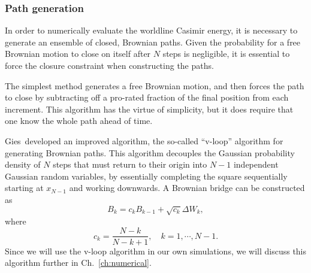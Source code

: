 \subsubsection{Path generation}

In order to numerically evaluate the worldline Casimir energy, it is necessary to generate 
an ensemble of closed, Brownian paths.  Given the probability for a free Brownian motion to close 
on itself after $N$ steps is negligible, it is essential to force the closure constraint when
constructing the paths.  

The simplest method generates a free Brownian motion, and then forces the path to close by subtracting
off a pro-rated fraction of the final position from each increment.  %
This algorithm has the virtue of simplicity, but it does require that one know the whole path ahead of 
time.  

Gies~\etal developed an improved algorithm, the so-called ``v-loop'' algorithm for generating
Brownian paths\cite{Gies2003}. 
This algorithm decouples the Gaussian probability density of $N$ steps that must return
to their origin into $N-1$ independent Gaussian random variables, 
by essentially completing the square sequentially starting at $x_{N-1}$ and working downwards. 
A Brownian bridge can be constructed as 
\begin{equation}
  B_k = c_k B_{k-1} + \sqrt{c_k} \Delta W_k,
\end{equation}
where 
\begin{equation}
  c_k = \frac{N-k}{N-k+1}, \quad k=1,\cdots,N-1.
\end{equation}
Since we will use the v-loop algorithm in our own simulations, 
we will discuss this algorithm further in Ch.~\ref{ch:numerical}. 

